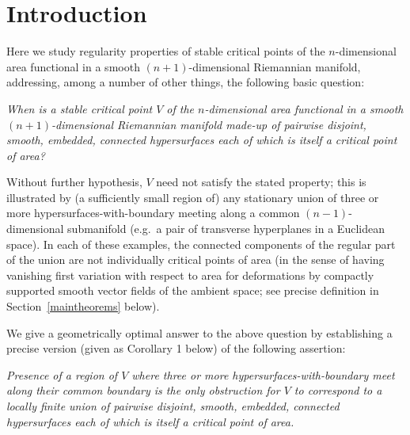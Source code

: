 \documentclass[a4paper,11pt]{amsart}
\begin{document}


\tableofcontents

\section{Introduction}\label{3-1}
\setcounter{equation}{0}
Here we study regularity properties of stable critical points of the $n$-dimensional area functional in a smooth $(n+1)$-dimensional Riemannian manifold, addressing, among a number of other things, the following basic question:

\textit{When is a stable critical point $V$ of the $n$-dimensional area functional in a smooth $(n+1)$-dimensional Riemannian manifold made-up of pairwise disjoint, smooth, embedded, connected hypersurfaces each of which is itself a critical point of area?} 

Without further hypothesis, $V$ need not satisfy the stated property; this is illustrated by (a sufficiently small region of) any stationary union of three or more hypersurfaces-with-boundary meeting along a common $(n-1)$-dimensional submanifold (e.g.\ a pair of transverse hyperplanes in a Euclidean space). In each of these examples, the connected components of the regular part of the union are not individually critical points of area (in the sense of having vanishing first variation with respect to area for deformations by compactly supported smooth vector fields of the ambient space; see precise definition in Section~\ref{maintheorems} below). 

We give a geometrically optimal answer to the above question by establishing a precise version (given as Corollary 1 below) of the following assertion: 

\textit{Presence of a region of $V$ where three or more hypersurfaces-with-boundary meet along their common boundary is the only obstruction for $V$ to correspond to a locally finite union of pairwise disjoint, smooth, embedded, connected hypersurfaces each of which is itself a critical point of area.} 
\end{document}
